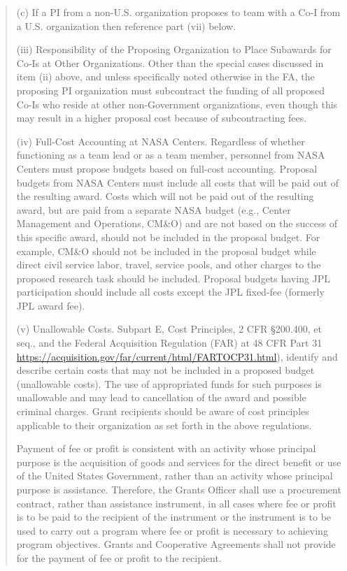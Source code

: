 \documentclass[12pt]{article}
\begin{document}
\begin{quote}
(c) If a PI from a non-U.S. organization proposes to team with a Co-I
from a U.S. organization then reference part (vii) below.

(iii) Responsibility of the Proposing Organization to Place Subawards
for Co-Is at Other Organizations. Other than the special cases
discussed in item (ii) above, and unless specifically noted otherwise
in the FA, the proposing PI organization must subcontract the funding
of all proposed Co-Is who reside at other non-Government
organizations, even though this may result in a higher proposal cost
because of subcontracting fees.

(iv) Full-Cost Accounting at NASA Centers. Regardless of whether
functioning as a team lead or as a team member, personnel from NASA
Centers must propose budgets based on full-cost accounting. Proposal
budgets from NASA Centers must include all costs that will be paid out
of the resulting award. Costs which will not be paid out of the
resulting award, but are paid from a separate NASA budget (e.g.,
Center Management and Operations, CM\&O) and are not based on the
success of this specific award, should not be included in the proposal
budget. For example, CM\&O should not be included in the proposal
budget while direct civil service labor, travel, service pools, and
other charges to the proposed research task should be
included. Proposal budgets having JPL participation should include all
costs except the JPL fixed-fee (formerly JPL award fee).

(v) Unallowable Costs. Subpart E, Cost Principles, 2 CFR \S200.400, et
seq., and the Federal Acquisition Regulation (FAR) at 48 CFR Part 31
\url{https://acquisition.gov/far/current/html/FARTOCP31.html}), identify and
describe certain costs that may not be included in a proposed budget
(unallowable costs). The use of appropriated funds for such purposes
is unallowable and may lead to cancellation of the award and possible
criminal charges. Grant recipients should be aware of cost principles
applicable to their organization as set forth in the above
regulations.

Payment of fee or profit is consistent with an activity whose
principal purpose is the acquisition of goods and services for the
direct benefit or use of the United States Government, rather than an
activity whose principal purpose is assistance. Therefore, the Grants
Officer shall use a procurement contract, rather than assistance
instrument, in all cases where fee or profit is to be paid to the
recipient of the instrument or the instrument is to be used to carry
out a program where fee or profit is necessary to achieving program
objectives. Grants and Cooperative Agreements shall not provide for
the payment of fee or profit to the recipient.


\end{quote}
\end{document}
